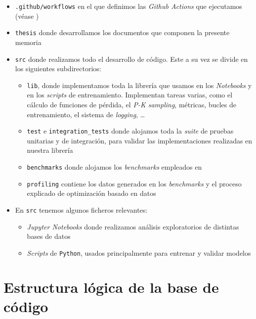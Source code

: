 \begin{itemize}
    \item \lstinline{.github/workflows} en el que definimos las \textit{Github Actions} que ejecutamos (véase )
    \item \lstinline{thesis} donde desarrollamos los documentos que componen la presente memoria
    \item \lstinline{src} donde realizamos todo el desarrollo de código. Este a su vez se divide en los siguientes subdirectorios:
        \begin{itemize}
            \item \lstinline{lib}, donde implementamos toda la librería que usamos en los \textit{Notebooks} y en los \textit{scripts} de entrenamiento. Implementan tareas varias, como el cálculo de funciones de pérdida, el \textit{P-K sampling}, métricas, bucles de entrenamiento, el sistema de \textit{logging}, \ldots
            \item \lstinline{test} e \lstinline{integration_tests} donde alojamos toda la \textit{suite} de pruebas unitarias y de integración, para validar las implementaciones realizadas en nuestra librería
            \item \lstinline{benchmarks} donde alojamos los \textit{benchmarks} empleados en 
            \item \lstinline{profiling} contiene los datos generados en los \textit{benchmarks} y el proceso explicado de optimización basado en datos
        \end{itemize}
    \item En \lstinline{src} tenemos algunos ficheros relevantes:

        \begin{itemize}
            \item \textit{Jupyter Notebooks} donde realizamos análisis exploratorios de distintas bases de datos
            \item \textit{Scripts} de \lstinline{Python}, usados principalmente para entrenar y validar modelos
        \end{itemize}\end{itemize}

\section{Estructura lógica de la base de código} \label{isec:estructura_paquetes_modulos}

